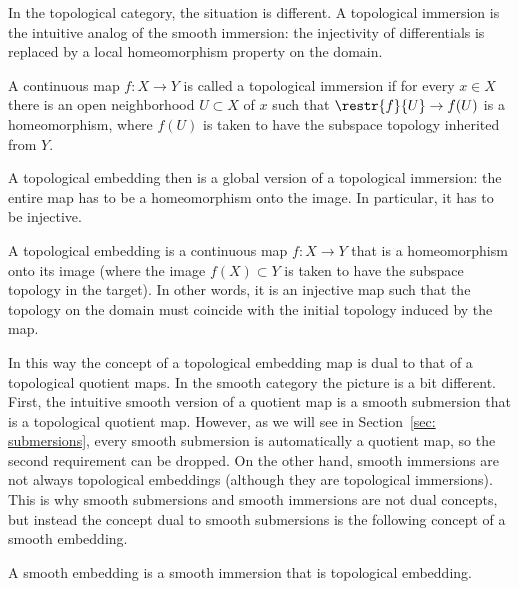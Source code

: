 In the topological category, the situation is different. A topological immersion is the intuitive analog of the smooth immersion: the injectivity of differentials is replaced by a local homeomorphism property on the domain. 

\begin{defn}
    A continuous map $f:X\to Y$ is called a topological immersion if for every $x\in X$ there is an open neighborhood $U\subset X$ of $x$ such that $\restr{f}{U}\to f(U)$ is a homeomorphism, where $f(U)$ is taken to have the subspace topology inherited from $Y$.
\end{defn}

A topological embedding then is a global version of a topological immersion: the entire map has to be a homeomorphism onto the image. In particular, it has to be injective.

\begin{defn}
A topological embedding is a continuous map $f:X\to Y$ that is a homeomorphism onto its image (where the image $f(X)\subset Y$ is taken to have the subspace topology in the target). In other words, it is an injective map such that the topology on the domain must coincide with the initial topology induced by the map.
\end{defn}


In this way the concept of a topological embedding map is dual to that of a topological quotient maps. In the smooth category the picture is a bit different. First, the intuitive smooth version of a quotient map is a smooth submersion that is a topological quotient map. However, as we will see in Section~\ref{sec: submersions}, every smooth submersion is automatically a quotient map, so the second requirement can be dropped. On the other hand, smooth immersions are not always topological embeddings (although they are topological immersions). This is why smooth submersions and smooth immersions are not dual concepts, but instead the concept dual to smooth submersions is the following concept of a smooth embedding.

\begin{defn}
A smooth embedding is a smooth immersion that is topological embedding.
\end{defn}

